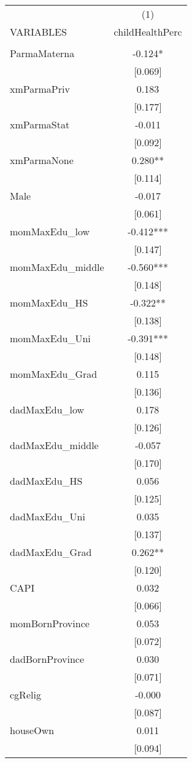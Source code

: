 \documentclass[]{article}
\begin{document}
\begin{tabular}{lc} \hline
 & (1) \\
VARIABLES & childHealthPerc \\ \hline
 &  \\
ParmaMaterna & -0.124* \\
 & [0.069] \\
xmParmaPriv & 0.183 \\
 & [0.177] \\
xmParmaStat & -0.011 \\
 & [0.092] \\
xmParmaNone & 0.280** \\
 & [0.114] \\
Male & -0.017 \\
 & [0.061] \\
momMaxEdu\_low & -0.412*** \\
 & [0.147] \\
momMaxEdu\_middle & -0.560*** \\
 & [0.148] \\
momMaxEdu\_HS & -0.322** \\
 & [0.138] \\
momMaxEdu\_Uni & -0.391*** \\
 & [0.148] \\
momMaxEdu\_Grad & 0.115 \\
 & [0.136] \\
dadMaxEdu\_low & 0.178 \\
 & [0.126] \\
dadMaxEdu\_middle & -0.057 \\
 & [0.170] \\
dadMaxEdu\_HS & 0.056 \\
 & [0.125] \\
dadMaxEdu\_Uni & 0.035 \\
 & [0.137] \\
dadMaxEdu\_Grad & 0.262** \\
 & [0.120] \\
CAPI & 0.032 \\
 & [0.066] \\
momBornProvince & 0.053 \\
 & [0.072] \\
dadBornProvince & 0.030 \\
 & [0.071] \\
cgRelig & -0.000 \\
 & [0.087] \\
houseOwn & 0.011 \\
 & [0.094] \\

\end{tabular}
\end{document}
